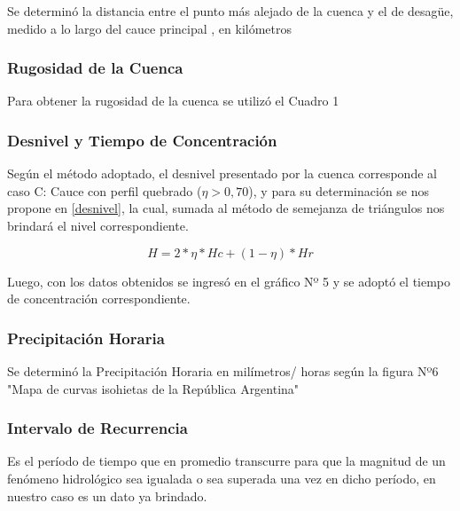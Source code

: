 \documentclass[../main.tex]{subfiles}
\begin{document}
Se determinó la distancia entre el punto más alejado de la cuenca y el de desagüe, medido a lo largo del cauce principal , en kilómetros 

\subsubsection{Rugosidad de la Cuenca}

Para obtener la rugosidad de la cuenca se utilizó el Cuadro 1


\subsubsection{Desnivel y Tiempo de Concentración}


Según el método adoptado, el desnivel presentado por la cuenca corresponde al caso C: Cauce con perfil quebrado ($\eta > 0,70$), y para su determinación se nos propone en \cref{desnivel}, la cual, sumada al método de semejanza de triángulos nos brindará el nivel correspondiente.

\begin{equation}
     H=2*\eta *Hc + (1-\eta)* Hr \label{desnivel}
\end{equation}

Luego, con los datos obtenidos se ingresó en el gráfico Nº 5 y se adoptó el tiempo de concentración correspondiente.

\subsubsection{Precipitación Horaria}

Se determinó la Precipitación Horaria en milímetros/ horas según la figura Nº6 "Mapa de curvas isohietas de la República Argentina" 

\subsubsection{Intervalo de Recurrencia}

Es el período de tiempo que en promedio transcurre para que la magnitud de un fenómeno hidrológico sea igualada o sea superada una vez en dicho período, en nuestro caso es un dato ya brindado.
\end{document}

